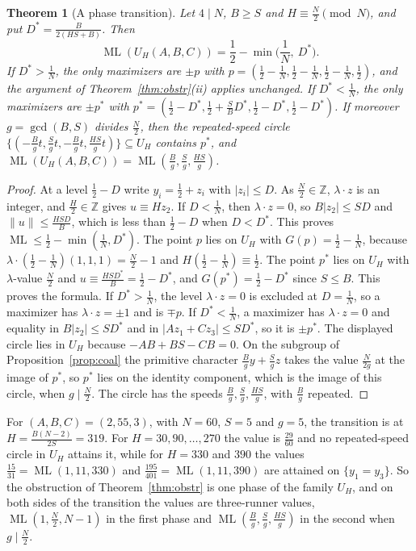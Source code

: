 \documentclass[12pt]{amsart}
\newtheorem{theorem}{Theorem}[section]
\theoremstyle{definition}\newtheorem{definition}[theorem]{Definition}
\theoremstyle{remark}\newtheorem{remark}[theorem]{Remark}
\newcommand{\Z}{\mathbb Z}\newcommand{\R}{\mathbb R}\newcommand{\T}{\mathbb T}
\newcommand{\norm}[1]{\lVert #1\rVert}
\newcommand{\ML}{\operatorname{ML}}
\begin{document}
\begin{theorem}[A phase transition]\label{thm:phase}
Let $4\mid N$, $B\ge S$ and $H\equiv\frac N2\pmod N$, and put $D^*=\frac B{2(HS+B)}$. Then
\[
 \ML(U_H(A,B,C))=\frac12-\min\Big(\frac1N,\ D^*\Big).
\]
If $D^*>\frac1N$, the only maximizers are $\pm p$ with $p=(\frac12-\frac1N,\frac12-\frac1N,\frac12-\frac1N,\frac12)$, and the argument of Theorem~\ref{thm:obstr}(ii) applies unchanged. If $D^*<\frac1N$, the only maximizers are $\pm p^*$ with $p^*=(\frac12-D^*,\frac12+\frac SBD^*,\frac12-D^*,\frac12-D^*)$. If moreover $g=\gcd(B,S)$ divides $\frac N2$, then the repeated-speed circle $\{(-\frac Bgt,\frac Sgt,-\frac Bgt,\frac{HS}gt)\}\subseteq U_H$ contains $p^*$, and $\ML(U_H(A,B,C))=\ML(\frac Bg,\frac Sg,\frac{HS}g)$.
\end{theorem}
\begin{proof}
At a level $\frac12-D$ write $y_i=\frac12+z_i$ with $|z_i|\le D$. As $\frac N2\in\Z$, $\lambda\cdot z$ is an integer, and $\frac H2\in\Z$ gives $u\equiv Hz_2$. If $D<\frac1N$, then $\lambda\cdot z=0$, so $B|z_2|\le SD$ and $\norm u\le\frac{HSD}B$, which is less than $\frac12-D$ when $D<D^*$. This proves $\ML\le\frac12-\min(\frac1N,D^*)$. The point $p$ lies on $U_H$ with $G(p)=\frac12-\frac1N$, because $\lambda\cdot(\frac12-\frac1N)(1,1,1)=\frac N2-1$ and $H(\frac12-\frac1N)\equiv\frac12$. The point $p^*$ lies on $U_H$ with $\lambda$-value $\frac N2$ and $u\equiv\frac{HSD^*}B=\frac12-D^*$, and $G(p^*)=\frac12-D^*$ since $S\le B$. This proves the formula. If $D^*>\frac1N$, the level $\lambda\cdot z=0$ is excluded at $D=\frac1N$, so a maximizer has $\lambda\cdot z=\pm1$ and is $\mp p$. If $D^*<\frac1N$, a maximizer has $\lambda\cdot z=0$ and equality in $B|z_2|\le SD^*$ and in $|Az_1+Cz_3|\le SD^*$, so it is $\pm p^*$. The displayed circle lies in $U_H$ because $-AB+BS-CB=0$. On the subgroup of Proposition~\ref{prop:coal} the primitive character $\frac Bgy+\frac Sgz$ takes the value $\frac N{2g}$ at the image of $p^*$, so $p^*$ lies on the identity component, which is the image of this circle, when $g\mid\frac N2$. The circle has the speeds $\frac Bg,\frac Sg,\frac{HS}g$, with $\frac Bg$ repeated.
\end{proof}

For $(A,B,C)=(2,55,3)$, with $N=60$, $S=5$ and $g=5$, the transition is at $H=\frac{B(N-2)}{2S}=319$. For $H=30,90,\dots,270$ the value is $\frac{29}{60}$ and no repeated-speed circle in $U_H$ attains it, while for $H=330$ and $390$ the values $\frac{15}{31}=\ML(1,11,330)$ and $\frac{195}{401}=\ML(1,11,390)$ are attained on $\{y_1=y_3\}$. So the obstruction of Theorem~\ref{thm:obstr} is one phase of the family $U_H$, and on both sides of the transition the values are three-runner values, $\ML(1,\frac N2,N-1)$ in the first phase and $\ML(\frac Bg,\frac Sg,\frac{HS}g)$ in the second when $g\mid\frac N2$.
\end{document}
